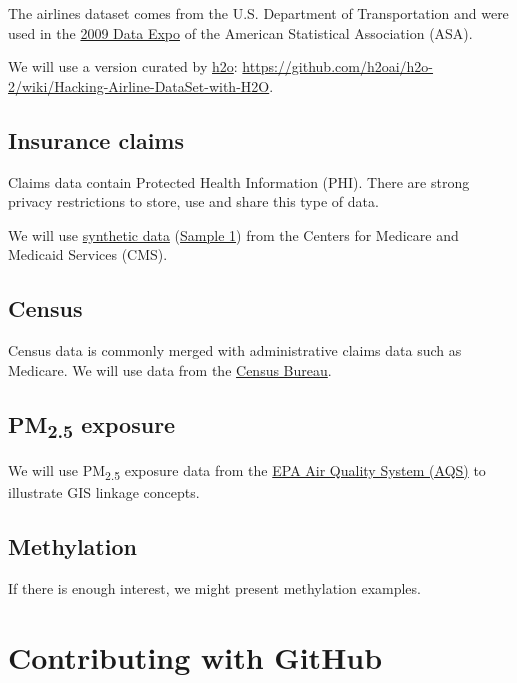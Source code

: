 \documentclass[]{book}
\theoremstyle{definition}
\theoremstyle{definition}
\theoremstyle{definition}
\theoremstyle{remark}
\begin{document}
The airlines dataset comes from the U.S. Department of Transportation
and were used in the
\href{http://stat-computing.org/dataexpo/2009/}{2009 Data Expo} of the
American Statistical Association (ASA).

We will use a version curated by \href{https://www.h2o.ai/}{h2o}:
\url{https://github.com/h2oai/h2o-2/wiki/Hacking-Airline-DataSet-with-H2O}.

\subsection{Insurance claims}\label{insurance-claims}

Claims data contain Protected Health Information (PHI). There are strong
privacy restrictions to store, use and share this type of data.

We will use
\href{https://www.cms.gov/Research-Statistics-Data-and-Systems/Downloadable-Public-Use-Files/SynPUFs/DE_Syn_PUF.html}{synthetic
data}
(\href{https://www.cms.gov/Research-Statistics-Data-and-Systems/Downloadable-Public-Use-Files/SynPUFs/DESample01.html}{Sample
1}) from the Centers for Medicare and Medicaid Services (CMS).

\subsection{Census}\label{census}

Census data is commonly merged with administrative claims data such as
Medicare. We will use data from the
\href{https://www.census.gov/data.html}{Census Bureau}.

\subsection{\texorpdfstring{PM\textsubscript{2.5}
exposure}{PM2.5 exposure}}\label{pm2.5-exposure}

We will use PM\textsubscript{2.5} exposure data from the
\href{https://www.epa.gov/aqs}{EPA Air Quality System (AQS)} to
illustrate GIS linkage concepts.

\subsection{Methylation}\label{methylation}

If there is enough interest, we might present methylation examples.

\section{Contributing with GitHub}\label{contributing-with-github}
\end{document}
